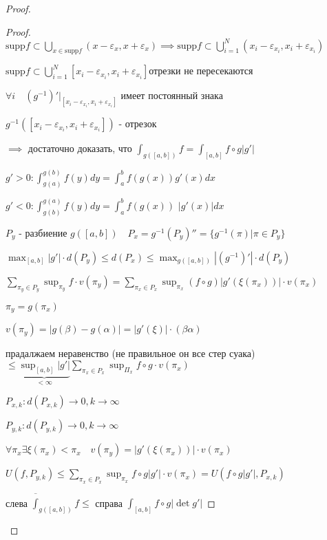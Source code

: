 \begin{proof}
\begin{lemma}
\begin{proof}
            $\text{supp}f \subset \bigcup_{x \in \text{supp}f} (x- \varepsilon_x, x + \varepsilon_x)
            \implies \text{supp}f \subset \bigcup^N_{i=1}(x_i - \varepsilon_{x_i}, x_i + \varepsilon_{x_i})
            $

            $\text{supp} f \subset \bigcup^N_{i=1}[x_i - \varepsilon_{x_i}, x_i + \varepsilon_{x_i}]
            $отрезки не пересекаются

            $\forall i \quad (g^{-1})' |_{[x_i - \varepsilon_{x_i}, x_i + \varepsilon_{x_i}]}$ имеет постоянный знака

            $g^{-1}([x_i - \varepsilon_{x_i}, x_i + \varepsilon_{x_i}])$ - отрезок

            $\implies $ достаточно доказать, что $\int_{g([a,b])}f = \int_{[a,b]} f\circ g |g'|$

            $g' > 0 : \int_{g(a)}^{g(b)}f(y)dy = \int^b_a f(g(x))g'(x)dx$

            $g' < 0 : \int_{g(b)}^{g(a)}f(y)dy = \int^b_a f(g(x)) \,\, | g'(x) | dx$

            $P_y$ - разбиение $g([a,b]) \quad P_x = g^{-1}(P_y)'' = \{ g^{-1}(\pi) | \pi \in P_y\}$

            $\max_{[a,b]} | g'| \cdot d(P_y) \le d(P_x) \le \max_{g([a,b])} | (g^{-1})'| \cdot d(P_y)$
            
            $\sum_{\pi_y \in P_y}\sup_{\pi_y}f \cdot v(\pi_y) = 
            \sum_{\pi_x \in P_x}\sup_{\pi_x} (f \circ g) |g'(\xi(\pi_x))| \cdot v(\pi_x)$

            $\pi_y = g(\pi_x)$   

            $v(\pi_y) = |g(\beta) - g(\alpha)| = |g'(\xi)| \cdot (\beta\alpha)$

            прадалжаем неравенство (не правильное он все стер суака) $\displaystyle\le \underbrace{\sup_{[a,b]}|g'|}_{<\infty} \sum_{\pi_x \in P_x}\sup_{\Pi_x}f\circ g \cdot v(\pi_x)$

            $P_{x,k}:d(P_{x,k}) \to 0, k \to \infty$

            $P_{y,k}:d(P_{y,k}) \to 0, k \to \infty$

            $\forall \pi_x \exists \xi(\pi_x) < \pi_x \quad v(\pi_y) = |g'(\xi(\pi_x))|\cdot v(\pi_x)$
            
            $U(f, P_{y,k}) \le \sum_{\pi_x \in P_x}\sup_{\pi_x}f\circ g |g'| \cdot v(\pi_x)
            = U(f\circ g |g'|, P_{x,k})
            $

            слева $\overline\int_{g([a,b])}f \le$ справа $\int_{[a,b]}f\circ g |\det g' |$


\end{proof}
\end{lemma}
\end{proof}
